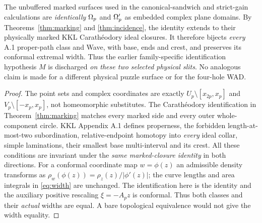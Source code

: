\begin{lemma}\label{lem:M}
The unbuffered marked surfaces used in the
canonical-sandwich and strict-gain calculations
are \emph{identically} $\Omega_p$ and $\Omega'_p$ as
embedded complex plane domains.  By
Theorems~\ref{thm:marking} and \ref{thm:incidence},
the identity extends to their physically
marked KKL Carath\'eodory ideal closures.
It therefore bijects \emph{every} A.1
proper-path class and Wave, with base,
ends and crest, and preserves its conformal
extremal width.  Thus the earlier
family-specific identification hypothesis
$M$ is discharged \emph{on these two
selected physical slits}.  No analogous
claim is made for a different physical
puzzle surface or for the four-hole WAD.
\end{lemma}
\begin{proof}
The point sets and complex coordinates
are exactly $U_p\setminus[x_{2p},x_p]$
and $V_p\setminus[-x_p,x_p]$, not
homeomorphic substitutes.  The
Carath\'eodory identification in
Theorem~\ref{thm:marking}
matches every marked side and every
outer whole-component circle.
KKL Appendix A.1 defines properness,
the forbidden length-at-most-two
subordination, relative-endpoint
homotopy into \emph{every} ideal collar,
simple laminations, their smallest
base multi-interval and its crest.
All these conditions are invariant
under the \emph{same marked-closure
identity} in both directions.
For a conformal coordinate map
$w=\phi(z)$ an admissible density
transforms as
$\rho_w(\phi(z))=\rho_z(z)/|\phi'(z)|$;
the curve lengths and area integrals
in \eqref{eq:width} are unchanged.
The identification here is the identity
and the auxiliary positive rescaling
$\xi=-A_pz$ is conformal.
Thus both classes and their
\emph{actual} widths are equal.
A bare topological equivalence
would not give the width equality.
\end{proof}

